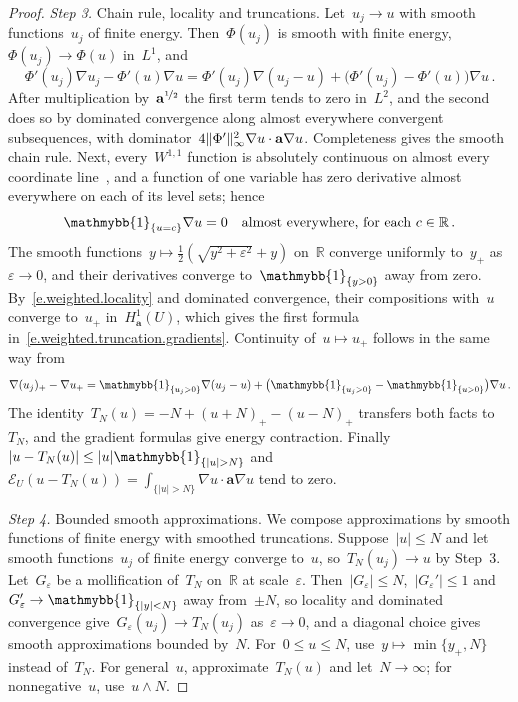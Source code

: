 \documentclass[11pt,letterpaper]{article}
\numberwithin{equation}{section}
\theoremstyle{definition}
\newcommand{\R}{\mathbb{R}}
\renewcommand{\a}{\mathbf{a}}
\newcommand{\eps}{\varepsilon}
\newcommand{\nf}{\nicefrac}
\DeclarePairedDelimiter{\norm}{\lVert}{\rVert}
\newcommand{\indc}{{\mathmybb{1}}}
\newcommand{\Ener}{\mathcal E}
\begin{document}
\begin{proof}
\emph{Step 3.} Chain rule, locality and truncations. Let~$u_j\to u$ with smooth functions~$u_j$ of finite energy. Then~$\Phi(u_j)$ is smooth with finite energy,~$\Phi(u_j)\to \Phi(u)$ in~$L^1$, and
\begin{equation*}
	\Phi'(u_j)\nabla u_j-\Phi'(u)\nabla u=\Phi'(u_j)\nabla(u_j-u)+\bigl(\Phi'(u_j)-\Phi'(u)\bigr)\nabla u\,.
\end{equation*}
After multiplication by~$\a^{\nf12}$ the first term tends to zero in~$L^2$, and the second does so by dominated convergence along almost everywhere convergent subsequences, with dominator~$4\norm{\Phi'}_\infty^2\nabla u\cdot\a\nabla u$. Completeness gives the smooth chain rule. Next, every~$W^{1,1}$ function is absolutely continuous on almost every coordinate line~\cite[Theorem 2.36]{Kinnunen.sobolev}, and a function of one variable has zero derivative almost everywhere on each of its level sets; hence
\begin{equation}
	\indc_{\{u=c\}}\nabla u=0\quad\mbox{almost everywhere, for each }c\in\R\,.
	\label{e.weighted.locality}
\end{equation}
The smooth functions~$y\mapsto\frac12(\sqrt{y^2+\eps^2}+y)$ on~$\R$ converge uniformly to~$y_+$ as~$\eps\to0$, and their derivatives converge to~$\indc_{\{y>0\}}$ away from zero. By~\eqref{e.weighted.locality} and dominated convergence, their compositions with~$u$ converge to~$u_+$ in~$H^1_\a(U)$, which gives the first formula in~\eqref{e.weighted.truncation.gradients}. Continuity of~$u\mapsto u_+$ follows in the same way from
\begin{equation*}
	\nabla(u_j)_+-\nabla u_+=\indc_{\{u_j>0\}}\nabla(u_j-u)+\bigl(\indc_{\{u_j>0\}}-\indc_{\{u>0\}}\bigr)\nabla u\,.
\end{equation*}
The identity~$T_N(u)=-N+(u+N)_+-(u-N)_+$ transfers both facts to~$T_N$, and the gradient formulas give energy contraction. Finally~$|u-T_N(u)|\leq|u|\indc_{\{|u|>N\}}$ and~$\Ener_U(u-T_N(u))=\int_{\{|u|>N\}}\nabla u\cdot\a\nabla u$ tend to zero.

\smallskip

\emph{Step 4.} Bounded smooth approximations. We compose approximations by smooth functions of finite energy with smoothed truncations. Suppose~$|u|\leq N$ and let smooth functions~$u_j$ of finite energy converge to~$u$, so~$T_N(u_j)\to u$ by Step~3. Let~$G_\eps$ be a mollification of~$T_N$ on~$\R$ at scale~$\eps$. Then~$|G_\eps|\leq N$,~$|G_\eps'|\leq1$ and~$G_\eps'\to\indc_{\{|y|<N\}}$ away from~$\pm N$, so locality and dominated convergence give~$G_\eps(u_j)\to T_N(u_j)$ as~$\eps\to0$, and a diagonal choice gives smooth approximations bounded by~$N$. For~$0\leq u\leq N$, use~$y\mapsto\min\{y_+,N\}$ instead of~$T_N$. For general~$u$, approximate~$T_N(u)$ and let~$N\to\infty$; for nonnegative~$u$, use~$u\wedge N$.


\end{proof}
\end{document}
